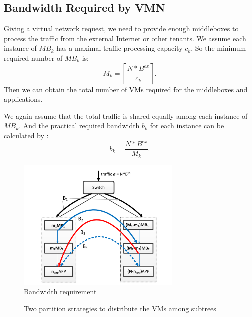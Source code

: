 \documentclass[review]{elsarticle}
\begin{document}
\subsection{Bandwidth Required by VMN}
Giving a virtual network request, we need to provide enough middleboxes to process the traffic from the external Internet or other tenants. We assume each instance of $MB_k$ has a maximal traffic processing capacity $c_k$, So the minimum required number of $MB_k$ is:
\begin{equation}
 M_{k}={\left\lceil\frac{N*B^{ex}}{c_{k}}\right\rceil}. 
\end{equation}
Then we can obtain the total number of VMs required for the middleboxes and applications. 

We again assume that the total traffic is shared equally among each instance of $MB_k$. And the practical required bandwidth $b_k$ for each instance can be calculated by :
\begin{equation}
b_{k}=\frac{N*B^{ex}}{M_{k}}.
\end{equation}


\begin{figure}
	\centering
	     \includegraphics[width=3.2 in, height=2.5in]{fig/bandwidth_requirement.pdf}
	\caption{Bandwidth requirement}
	\label{fig:bw}
\end{figure}

\begin{figure}
	\centering
	\caption{Two partition strategies to distribute the VMs among subtrees}
\end{figure}
\end{document}
